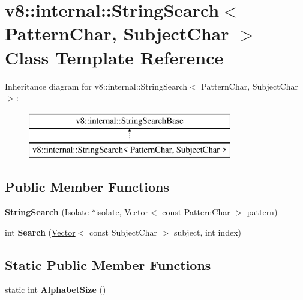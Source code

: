 \hypertarget{classv8_1_1internal_1_1_string_search}{}\section{v8\+:\+:internal\+:\+:String\+Search$<$ Pattern\+Char, Subject\+Char $>$ Class Template Reference}
\label{classv8_1_1internal_1_1_string_search}
Inheritance diagram for v8\+:\+:internal\+:\+:String\+Search$<$ Pattern\+Char, Subject\+Char $>$\+:\begin{figure}[H]
\begin{center}
\leavevmode
\includegraphics[height=2.000000cm]{classv8_1_1internal_1_1_string_search}
\end{center}
\end{figure}
\subsection*{Public Member Functions}
\begin{DoxyCompactItemize}
\item 
{\bfseries String\+Search} (\hyperlink{classv8_1_1internal_1_1_isolate}{Isolate} $\ast$isolate, \hyperlink{classv8_1_1internal_1_1_vector}{Vector}$<$ const Pattern\+Char $>$ pattern)\hypertarget{classv8_1_1internal_1_1_string_search_ac85cd7d81456c38b54ca0dd30232294e}{}\label{classv8_1_1internal_1_1_string_search_ac85cd7d81456c38b54ca0dd30232294e}

\item 
int {\bfseries Search} (\hyperlink{classv8_1_1internal_1_1_vector}{Vector}$<$ const Subject\+Char $>$ subject, int index)\hypertarget{classv8_1_1internal_1_1_string_search_ad1e65aa301ab863ab3150ca02d6dfdc2}{}\label{classv8_1_1internal_1_1_string_search_ad1e65aa301ab863ab3150ca02d6dfdc2}

\end{DoxyCompactItemize}
\subsection*{Static Public Member Functions}
\begin{DoxyCompactItemize}
\item 
static int {\bfseries Alphabet\+Size} ()\hypertarget{classv8_1_1internal_1_1_string_search_a2fa4be83d94f58d7804f6db7f8ca484d}{}\label{classv8_1_1internal_1_1_string_search_a2fa4be83d94f58d7804f6db7f8ca484d}

\end{DoxyCompactItemize}
